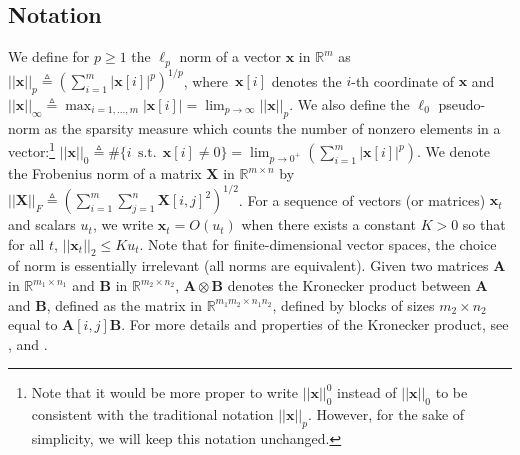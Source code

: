 \documentclass[twoside,11pt]{article}
\def\x{{\mathbf x}}
\def\X{{\mathbf X}}
\def\B{{\mathbf B}}
\def\O{{O}}
\def\Real{{\mathbb R}}
\def\A{{\mathbf A}}
\def\st{~~\text{s.t.}~~}
\def\defin{\stackrel{\vartriangle}{=}}
\begin{document}
\subsection{Notation}
We define for $p \geq 1$ the $\ell_p$ norm of a vector $\x$ in
$\Real^m$ as $||\x||_p \defin (\sum_{i=1}^m |\x[i]|^p)^{{1}/{p}}$,
where~$\x[i]$ denotes the $i$-th coordinate of $\x$ and 
$||\x||_\infty \defin \max_{i=1,\ldots,m} |\x[i]| = \lim_{p \to \infty} ||\x||_p$.
We also define the $\ell_0$ pseudo-norm as the sparsity measure which counts
the number of nonzero elements in a vector:\footnote{Note that it would
be more proper to write $||\x||_0^0$ instead of $||\x||_0$ to be consistent with the traditional notation $||\x||_p$.
However, for the sake of simplicity, we will keep this
notation unchanged.} $||\x||_0 \defin \#\{i \st \x[i] \neq 0  \} = \lim_{p \to 0^+}  (\sum_{i=1}^m |\x[i]|^p)$.
We denote the Frobenius norm of a matrix $\X$ in $\Real^{m \times n}$ by
$||\X||_F \defin (\sum_{i=1}^m \sum_{j=1}^n \X[i,j]^2)^{{1}/{2}}$.
For a sequence of vectors (or
matrices) $\x_t$ and scalars $u_t$, we write $\x_t = \O(u_t)$
when there exists a constant $K > 0$ so that for all $t$,
$||\x_t||_2 \leq K u_t$.
Note that for finite-dimensional vector spaces, the choice of norm is essentially irrelevant (all norms are equivalent).
Given two matrices $\A$ in $\Real^{m_1 \times n_1}$ and $\B$ in $\Real^{m_2 \times n_2}$,
$\A \otimes \B$ denotes the Kronecker product between $\A$ and $\B$,
defined as the matrix in $\Real^{m_1m_2 \times n_1n_2}$, defined by blocks of
sizes $m_2 \times n_2$ equal to $\A[i,j] \B$.
For more details and properties of the Kronecker product, see \citet{golub}, and \citet{magnus}.
\end{document}
